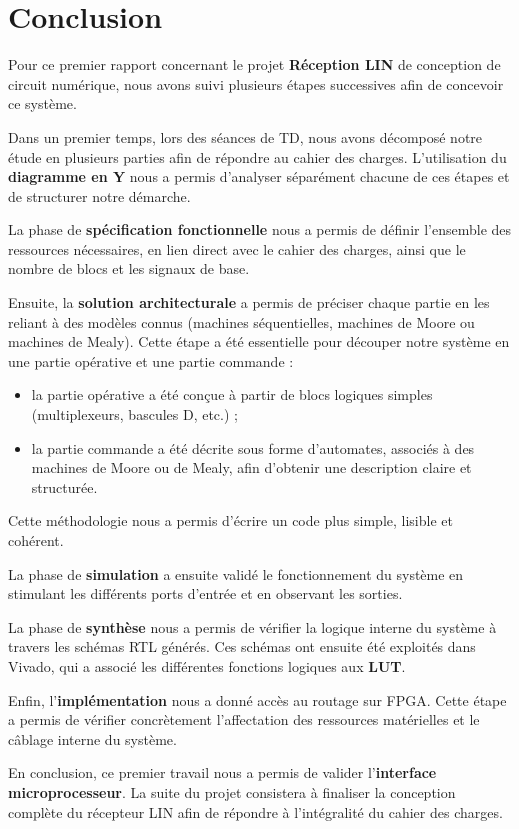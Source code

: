 \section{Conclusion}

Pour ce premier rapport concernant le projet \textbf{Réception LIN} de conception de circuit numérique, 
nous avons suivi plusieurs étapes successives afin de concevoir ce système.  

Dans un premier temps, lors des séances de TD, nous avons décomposé notre étude en plusieurs parties afin de répondre au cahier des charges. 
L’utilisation du \textbf{diagramme en Y} nous a permis d’analyser séparément chacune de ces étapes et de structurer notre démarche. 
\newline

La phase de \textbf{spécification fonctionnelle} nous a permis de définir l’ensemble des ressources 
nécessaires, 
en lien direct avec le cahier des charges, ainsi que le nombre de blocs et les signaux de base.  
\newline

Ensuite, la \textbf{solution architecturale} a permis de préciser chaque partie en les reliant à des 
modèles connus 
(machines séquentielles, machines de Moore ou machines de Mealy). 
Cette étape a été essentielle pour découper notre système en une partie opérative et une partie commande :  
\newline

\begin{itemize}
    \item la partie opérative a été conçue à partir de blocs logiques simples (multiplexeurs, bascules D, etc.) ;  
    \item la partie commande a été décrite sous forme d’automates, associés à des machines de Moore ou de Mealy, 
    afin d’obtenir une description claire et structurée.  
\end{itemize}
Cette méthodologie nous a permis d’écrire un code plus simple, lisible et cohérent.  

La phase de \textbf{simulation} a ensuite validé le fonctionnement du système en stimulant les différents ports d’entrée 
et en observant les sorties.  
\newline

La phase de \textbf{synthèse} nous a permis de vérifier la logique interne du système à travers les schémas RTL générés. 
Ces schémas ont ensuite été exploités dans Vivado, qui a associé les différentes fonctions logiques aux \textbf{LUT}.  
\newline

Enfin, l’\textbf{implémentation} nous a donné accès au routage sur FPGA. 
Cette étape a permis de vérifier concrètement l’affectation des ressources matérielles et le câblage interne du système.  
\newline

En conclusion, ce premier travail nous a permis de valider l’\textbf{interface microprocesseur}. 
La suite du projet consistera à finaliser la conception complète du récepteur LIN afin de répondre à l’intégralité du cahier des charges.
